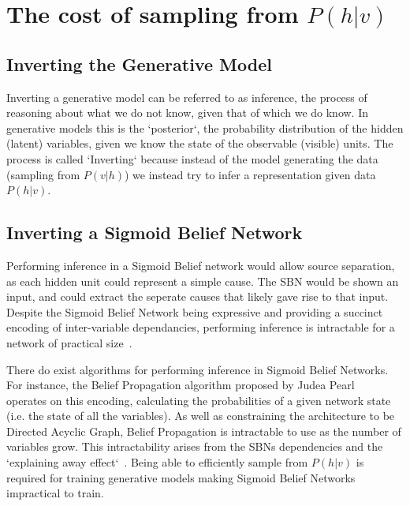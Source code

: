 \section{The cost of sampling from $P(h|v)$}

\subsection{Inverting the Generative Model}

Inverting a generative model can be referred to as inference, the process of reasoning about what we do not know, given that of which we do know. In generative models this is the `posterior`, the probability distribution of the hidden (latent) variables, given we know the state of the observable (visible) units. The process is called `Inverting` because instead of the model generating the data (sampling from $P(v|h)$) we instead try to infer a representation given data $P(h|v)$.



\subsection{Inverting a Sigmoid Belief Network}

Performing inference in a Sigmoid Belief network would allow source separation, as each hidden unit could represent a simple cause. The SBN would be shown an input, and could extract the seperate causes that likely gave rise to that input. Despite the Sigmoid Belief Network being expressive and providing a succinct encoding of inter-variable dependancies, performing inference is intractable for a network of practical size~\cite{Jensen95blockinggibbs}.

There do exist algorithms for performing inference in Sigmoid Belief Networks. For instance, the Belief Propagation algorithm proposed by Judea Pearl~\cite{Pearl1982} operates on this encoding, calculating the probabilities of a given network state (i.e. the state of all the variables). As well as constraining the architecture to be Directed Acyclic Graph, Belief Propagation is intractable to use as the number of variables grow. This intractability arises from the SBNs dependencies and the `explaining away effect`~\cite{Hinton:2006:FLA:1161603.1161605}. Being able to efficiently sample from $P(h|v)$ is required for training generative models making Sigmoid Belief Networks impractical to train.

